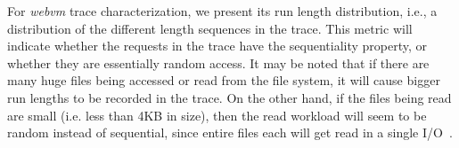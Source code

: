 For \textit{webvm} trace characterization, we present its run length
distribution, i.e., a distribution of the different length sequences
in the trace. This metric will indicate whether the requests in the
trace have the sequentiality property, or whether they are essentially
random access. It may be noted that if there are many huge files being
accessed or read from the file system, it will cause bigger run lengths
to be recorded in the trace. On the other hand, if the files being read are 
small (i.e. less than 4KB in size), then the read workload will seem to be
random instead of sequential, since entire files
each will get read in a single I/O~\cite{animation-nfs}.

\begin{figure}[t]
	\centering
	\hfill

\end{figure}
